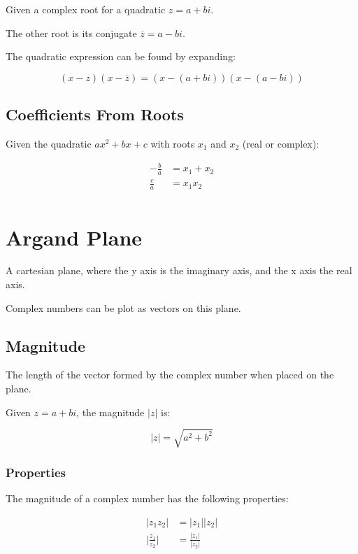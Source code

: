 \documentclass[a4paper,11pt]{report}
\begin{document}
Given a complex root for a quadratic $z = a + bi$.

The other root is its conjugate $\overline{z} = a - bi$.

The quadratic expression can be found by expanding:

$$
(x - z)(x - \overline{z}) = (x - (a + bi))(x - (a - bi))
$$

\subsection{Coefficients From Roots}

Given the quadratic $ax^2 + bx + c$ with roots $x_1$ and $x_2$ (real or
complex):

$$
\begin{aligned}
-\frac{b}{a} & = x_1 + x_2 \\
\frac{c}{a} & = x_1 x_2 \\
\end{aligned}
$$


\section{Argand Plane}

A cartesian plane, where the y axis is the imaginary axis, and the x axis the
real axis.

Complex numbers can be plot as vectors on this plane.

\subsection{Magnitude}

The length of the vector formed by the complex number when placed on the plane.

Given $z = a + bi$, the magnitude $\lvert z \rvert$ is:

$$
\lvert z \rvert = \sqrt{a^2 + b^2}
$$

\subsubsection{Properties}

The magnitude of a complex number has the following properties:

$$
\begin{aligned}
\lvert z_1 z_2 \rvert & = \lvert z_1 \rvert \lvert z_2 \rvert \\
\lvert \frac{z_1}{z_2} \rvert & = \frac{\lvert z_1 \rvert}{\lvert z_2 \rvert} \\
\end{aligned}
$$
\end{document}
